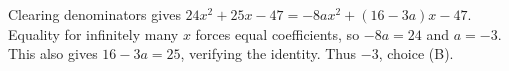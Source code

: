Clearing denominators gives $24x^2+25x-47=-8ax^2+(16-3a)x-47$. Equality for infinitely many $x$ forces equal coefficients, so $-8a=24$ and $a=-3$. This also gives $16-3a=25$, verifying the identity. Thus $\boxed{-3}$, choice (B).
